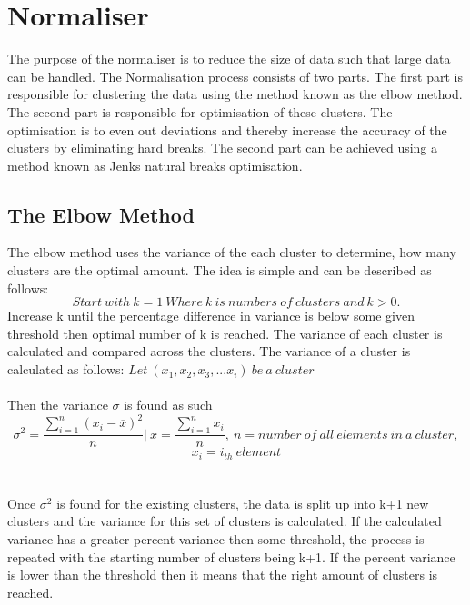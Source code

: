 \section{Normaliser}
\label{sec:normaliser}
The purpose of the normaliser is to reduce the size of data such that large data can be handled. The Normalisation process consists of two parts. The first part is responsible for clustering the data using the method known as the elbow method. The second part is responsible for optimisation of these clusters. The optimisation is to even out deviations and thereby increase the accuracy of the clusters by eliminating hard breaks. The second part can be achieved using a method known as Jenks natural breaks optimisation.

\subsection{The Elbow Method}
\label{sub:elbow_method}
The elbow method uses the variance of the each cluster to determine, how many clusters are the optimal amount. The idea is simple and can be described as follows:
 $$Start\ with\ k = 1\ Where \ k \ is \ numbers \ of \ clusters \ and \ k>0.$$ 
Increase k until the percentage difference in variance is below some given threshold then optimal number of k is reached.
The variance of each cluster is calculated and compared across the clusters. The variance of a cluster is calculated as follows:
$Let\ (x_1,x_2,x_3,...x_i) \ be \ a\ cluster $
\\\\Then the variance $\sigma$ is found as such
$$\sigma^2 = \frac{\displaystyle\sum_{i = 1}^{n}(x_{i}-\overline{x})^2 }{n} \Biggr\rvert\ \overline{x}  =\frac{\displaystyle\sum_{i=1}^{n}x_{i}}{n},\ n =number\ of\ all\ elements\ in\ a\ cluster ,$$ 
$$ x_{i} = i_{th}\ element $$
\\\\
Once $\sigma^2$ is found for the existing clusters, the data is split up into k+1 new clusters and the variance for this set of clusters is calculated. If the calculated variance has a greater percent variance then some threshold, the process is repeated with the starting number of clusters being k+1. If the percent variance is lower than the threshold then it means that the right amount of clusters is reached.
